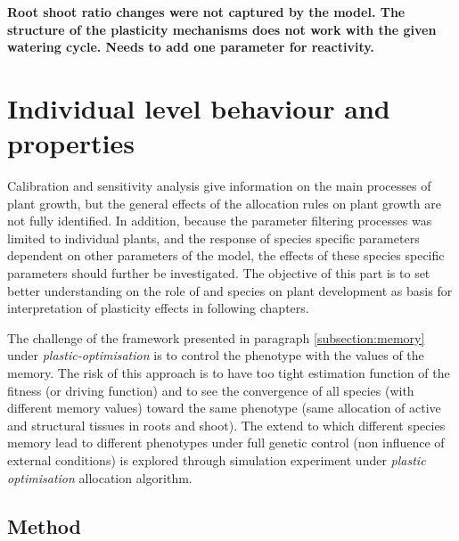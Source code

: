 \textbf{Root shoot ratio changes were not captured by the model. The structure of the plasticity mechanisms does not work with the given watering cycle. Needs to add one parameter for reactivity.}



\section{Individual level behaviour and properties}


Calibration and sensitivity analysis give information on the main processes of plant growth, but the general effects of the allocation rules on plant growth are not fully identified. In addition, because the parameter filtering processes was limited to individual plants, and the response of species specific parameters dependent on other parameters of the model, the effects of these species specific parameters should further be investigated. The objective of this part is to set better understanding on the role of  and species  on plant development as basis for interpretation of plasticity effects in following chapters.

The challenge of the framework presented in paragraph \ref{subsection:memory} under \textit{plastic-optimisation} is to control the phenotype with the values of the memory. The risk of this approach is to have too tight estimation function of the fitness (or driving function) and to see the convergence of all species (with different memory values) toward the same phenotype (same allocation of active and structural tissues in roots and shoot). The extend to which different species memory lead to different phenotypes under full genetic control (non influence of external conditions) is explored through simulation experiment under \textit{plastic optimisation} allocation algorithm.

\subsection{Method}



